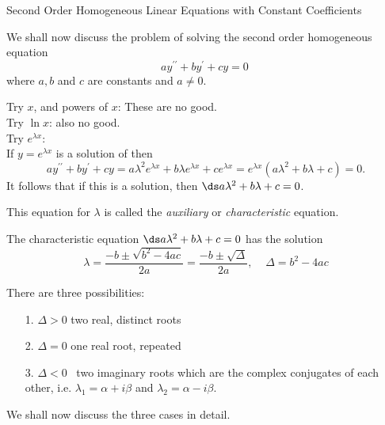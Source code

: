 \begin{frame}{Second Order Homogeneous Linear Equations with Constant Coefficients}
 
 We shall now discuss the problem of solving the second order  homogeneous equation 
\[ 
ay^{\prime \prime }+by^{\prime }+cy=0\ 
\] 
 where $a,b$ and $c$ are constants and $a\neq 0$.\\
 
 \vsp  
 
 Try $x$, and powers of $x$: These are no  good. \\ \pause  
 Try $\ln x$: also no good.\\ \pause 
 Try $e^{\lambda x}$: \\ \pause 
  If $y=e^{\lambda x}$ is a solution of   then
\[
ay^{\prime \prime }+by^{\prime }+cy=a\lambda ^{2}e^{\lambda x} + b\lambda e^{\lambda
 x}+ce^{\lambda x}=e^{\lambda x} (a\lambda ^{2}+b\lambda +c)=0. \] 
\pause  
It follows that if this is a solution, then
 $\ds   a\lambda ^{2}+b\lambda +c=0$.
   
 This equation for $\lambda $ is called the \textit{auxiliary} or \textit{%
 characteristic} equation.
 
 \end{frame}
 
 
 
 \begin{frame}
 The characteristic equation
$\ds   a\lambda ^{2}+b\lambda +c=0$ has the solution 
\[\lambda =\dfrac{-b\pm \sqrt{b^{2}-4ac}}{2a}=\dfrac{-b\pm \sqrt{\Delta }}{2a},\;\;\;\; \Delta =b^{2}-4ac 
 \]
 
 \pause 
 
 There are three possibilities:
\begin{itemize}
\item[1.] $\Delta >0$  two real, distinct roots \pause  
\item[2.] $\Delta =0$  one real root, repeated \pause 
\item[3.] $\Delta <0$ \ two imaginary roots which are the complex conjugates of  each other, i.e. $\lambda _{1}=\alpha +i\beta $ and  $\lambda_{2}=\alpha -i\beta$.
\end{itemize} 
  
 We shall now discuss the three cases in detail.
 
 \end{frame}
 
 
 

